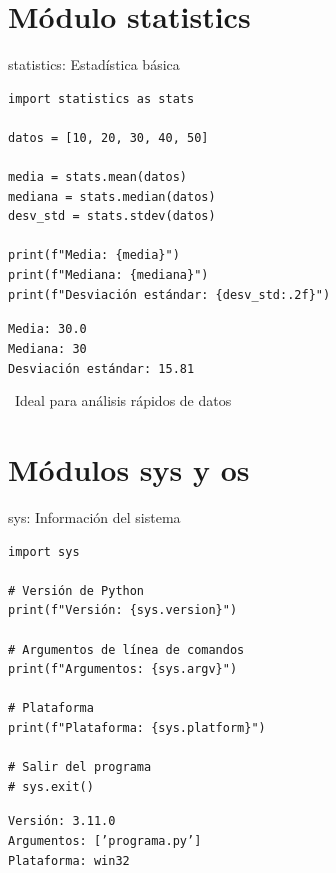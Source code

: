 \documentclass{beamer}
\begin{document}
\section{Módulo statistics}

\begin{frame}[fragile]{statistics: Estadística básica \faChartBar}
\begin{lstlisting}
import statistics as stats

datos = [10, 20, 30, 40, 50]

media = stats.mean(datos)
mediana = stats.median(datos)
desv_std = stats.stdev(datos)

print(f"Media: {media}")
print(f"Mediana: {mediana}")
print(f"Desviación estándar: {desv_std:.2f}")
\end{lstlisting}

\vspace{-0.2cm}
\begin{tcolorbox}[colback=green!10,colframe=green,title={\small\faArrowCircleRight \ Salida},coltitle=fg0,left=3pt,right=3pt,top=2pt,bottom=2pt,boxsep=1pt]
\small\texttt{Media: 30.0\\
Mediana: 30\\
Desviación estándar: 15.81}
\end{tcolorbox}

\vspace{-0.1cm}
\begin{notebox}
\small\faLightbulb\ Ideal para análisis rápidos de datos
\end{notebox}
\end{frame}

\section{Módulos sys y os}

\begin{frame}[fragile]{sys: Información del sistema \faTerminal}
\begin{lstlisting}
import sys

# Versión de Python
print(f"Versión: {sys.version}")

# Argumentos de línea de comandos
print(f"Argumentos: {sys.argv}")

# Plataforma
print(f"Plataforma: {sys.platform}")

# Salir del programa
# sys.exit()
\end{lstlisting}

\vspace{-0.2cm}
\begin{tcolorbox}[colback=green!10,colframe=green,title={\small\faArrowCircleRight \ Salida (ejemplo)},coltitle=fg0,left=3pt,right=3pt,top=2pt,bottom=2pt,boxsep=1pt]
\small\texttt{Versión: 3.11.0\\
Argumentos: ['programa.py']\\
Plataforma: win32}
\end{tcolorbox}
\end{frame}
\end{document}
